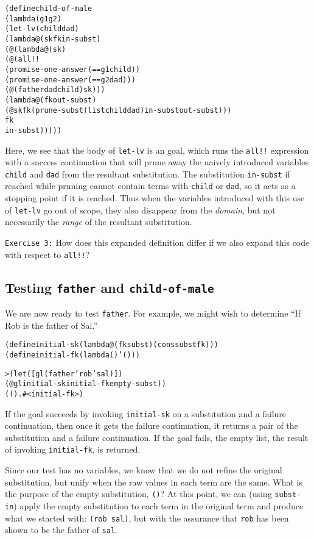 \begin{alltt}
(define child-of-male
  (lambda (g1 g2)
    (let-lv (child dad)
      (lambda@ (sk fk in-subst)
        (@ (lambda@ (sk)
             (@ (all!!
                  (promise-one-answer (== g1 child))
                  (promise-one-answer (== g2 dad)))
                (@ (father dad child) sk)))
           (lambda@ (fk out-subst)
             (@ sk fk (prune-subst (list child dad) in-subst out-subst)))
           fk
           in-subst)))))
\end{alltt}

Here, we see that the body of \texttt{let-lv} is an goal, which
runs the \texttt{all!!} expression with a success continuation that
will prune away the naively introduced variables \texttt{child} and
\texttt{dad} from the resultant substitution.  The substitution
\texttt{in-subst} if reached while pruning cannot contain terms with
\texttt{child} or \texttt{dad}, so it acts as a stopping point if it
is reached.  Thus when the variables introduced with this use of
\texttt{let-lv} go out of scope, they also disappear from the
\emph{domain}, but not necessarily the \emph{range} of the resultant
substitution.

\noindent
\texttt{Exercise 3:} How does this expanded definition differ if we
also expand this code with respect to \texttt{all!!}?\endofexercise

\subsection{Testing \texttt{father} and \texttt{child-of-male}}

We are now ready to test \texttt{father}.  For example, we might wish
to determine ``If Rob is the father of Sal.''

\begin{alltt}
(define initial-sk (lambda@ (fk subst) (cons subst fk)))
(define initial-fk (lambda () '()))

> (let ([gl (father 'rob 'sal)])
    (@ gl initial-sk initial-fk empty-subst))
(() . #<initial-fk>)
\end{alltt}

If the goal succeeds by invoking \texttt{initial-sk} on a substitution
and a failure continuation, then once it gets the failure
continuation, it returns a pair of the substitution and a failure
continuation. If the goal fails, the empty list, the result of
invoking \texttt{initial-fk}, is returned.

Since our test has no variables, we know that we do not refine the
original substitution, but unify when the raw values in each term are
the same.  What is the purpose of the empty substitution, \texttt{()}?
At this point, we can (using \texttt{subst-in}) apply the empty
substitution to each term in the original term and produce what we
started with: \texttt{(rob sal)}, but with the assurance that
\texttt{rob} has been shown to be the father of \texttt{sal}.

